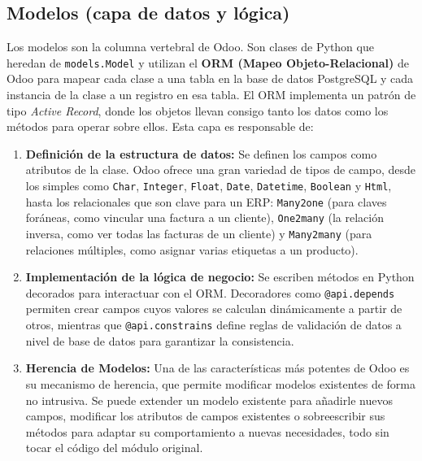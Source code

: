 \documentclass[12pt,letterpaper,spanish]{report}
\begin{document}
\subsection{Modelos (capa de datos y lógica)}
\label{sub:modelos_odoo}
Los modelos son la columna vertebral de Odoo. Son clases de Python que heredan de \texttt{models.Model} y utilizan el \textbf{ORM (Mapeo Objeto-Relacional)} de Odoo para mapear cada clase a una tabla en la base de datos PostgreSQL y cada instancia de la clase a un registro en esa tabla. El ORM implementa un patrón de tipo \textit{Active Record}, donde los objetos llevan consigo tanto los datos como los métodos para operar sobre ellos. Esta capa es responsable de:

\begin{enumerate}
    \item \textbf{Definición de la estructura de datos:} Se definen los campos como atributos de la clase. Odoo ofrece una gran variedad de tipos de campo, desde los simples como \texttt{Char}, \texttt{Integer}, \texttt{Float}, \texttt{Date}, \texttt{Datetime}, \texttt{Boolean} y \texttt{Html}, hasta los relacionales que son clave para un ERP: \texttt{Many2one} (para claves foráneas, como vincular una factura a un cliente), \texttt{One2many} (la relación inversa, como ver todas las facturas de un cliente) y \texttt{Many2many} (para relaciones múltiples, como asignar varias etiquetas a un producto).

    \item \textbf{Implementación de la lógica de negocio:} Se escriben métodos en Python decorados para interactuar con el ORM. Decoradores como \texttt{@api.depends} permiten crear campos cuyos valores se calculan dinámicamente a partir de otros, mientras que \texttt{@api.constrains} define reglas de validación de datos a nivel de base de datos para garantizar la consistencia.

    \item \textbf{Herencia de Modelos:} Una de las características más potentes de Odoo es su mecanismo de herencia, que permite modificar modelos existentes de forma no intrusiva. Se puede extender un modelo existente para añadirle nuevos campos, modificar los atributos de campos existentes o sobreescribir sus métodos para adaptar su comportamiento a nuevas necesidades, todo sin tocar el código del módulo original.
\end{enumerate}
\end{document}

